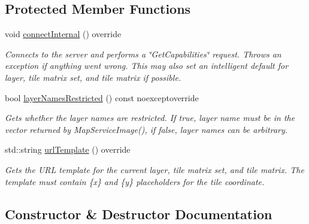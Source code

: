 \subsection*{Protected Member Functions}
\begin{DoxyCompactItemize}
\item 
void \hyperlink{classdg_1_1deepcore_1_1imagery_1_1_tile_json_client_ab27ce371e1b62021024e92cf935e1000}{connect\+Internal} () override
\begin{DoxyCompactList}\small\item\em Connects to the server and performs a \char`\"{}\+Get\+Capabilities\char`\"{} request. Throws an exception if anything went wrong. This may also set an intelligent default for layer, tile matrix set, and tile matrix if possible. \end{DoxyCompactList}\item 
bool \hyperlink{classdg_1_1deepcore_1_1imagery_1_1_tile_json_client_ad0dbd13307d3724bddc25cb8ae1143bc}{layer\+Names\+Restricted} () const noexceptoverride
\begin{DoxyCompactList}\small\item\em Gets whether the layer names are restricted. If true, layer name must be in the vector returned by Map\+Service\+Image(), if false, layer names can be arbitrary. \end{DoxyCompactList}\item 
std\+::string \hyperlink{classdg_1_1deepcore_1_1imagery_1_1_tile_json_client_ae244e98e95f177712376a116be409912}{url\+Template} () override
\begin{DoxyCompactList}\small\item\em Gets the U\+RL template for the current layer, tile matrix set, and tile matrix. The template must contain \{x\} and \{y\} placeholders for the tile coordinate. \end{DoxyCompactList}\end{DoxyCompactItemize}


\subsection{Constructor \& Destructor Documentation}
